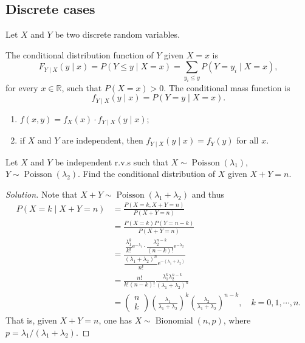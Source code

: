 \documentclass[11pt,singlecolumn, openany, citestyle=authoryear]{elegantbook}
\begin{document}
\begin{CJK}{UTF8}{gbsn}
\subsection{Discrete cases}
Let $X$ and $Y$ be two discrete random variables.
\begin{definition}
    The conditional distribution function of $Y$ given $X=x$ is 
    \begin{equation}
        F_{Y\mid X}(y\mid x) = P(Y\leqslant y \mid X = x)=
        \sum_{y_i\leqslant y}P(Y=y_i\mid X=x), 
    \end{equation} 
    for every $x \in \mathbb{R}$, such that $P(X=x)>0$.
    The conditional mass function is 
    \begin{equation}
        f_{Y\mid X}(y \mid x)=P(Y=y\mid X=x).
    \end{equation}
\end{definition}
\begin{remark}
    \begin{enumerate}
        \item $f(x,y)=f_X(x)\cdot f_{Y\mid X}(y\mid x)$;
        \item if $X$ and $Y$ are independent, then $f_{Y\mid X}(y\mid x)=f_Y(y)$ for all $x$.
    \end{enumerate}
\end{remark}

\begin{example}
    Let $X$ and $Y$ be independent r.v.s such that $X\sim \operatorname*{Poisson}(\lambda_1)$,
    $Y\sim \operatorname*{Poisson}(\lambda_2)$. Find the conditional distribution of $X$ given 
    $X+Y=n$.
\end{example}
\begin{proof}[Solution]
    Note that $X+Y \sim \operatorname*{Poisson}(\lambda_1+\lambda_2)$ and thus 
    $$
    \begin{aligned}
        P(X=k \mid X+Y=n) & =\frac{P(X=k, X+Y=n)}{P(X+Y=n)} \\
        & =\frac{P(X=k) P(Y=n-k)}{P(X+Y=n)} \\
        & =\frac{\dfrac{\lambda_1^k}{k !} \mathrm{e}^{-\lambda_1} \cdot \dfrac{\lambda_2^{n-k}}{(n-k) !} \mathrm{e}^{-\lambda_2}}{\dfrac{\left(\lambda_1+\lambda_2\right)^n}{n !} \mathrm{e}^{-\left(\lambda_1+\lambda_2\right)}} \\
        & =\frac{n !}{k !(n-k) !} \frac{\lambda_1^k \lambda_2^{n-k}}{\left(\lambda_1+\lambda_2\right)^n} \\
        & =\left(\begin{array}{l}
        n \\
        k
        \end{array}\right)\left(\frac{\lambda_1}{\lambda_1+\lambda_2}\right)^k\left(\frac{\lambda_2}{\lambda_1+\lambda_2}\right)^{n-k}, \quad k=0,1, \cdots, n .
    \end{aligned}
    $$
    That is, given $X+Y=n$, one has $X\sim\operatorname*{Bionomial}(n,p)$, where $p=\lambda_1/(\lambda_1+\lambda_2)$.
\end{proof}


\end{CJK}
\end{document}
